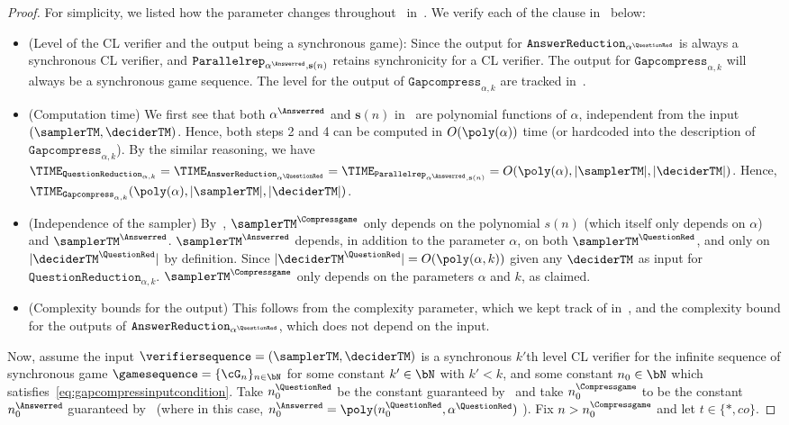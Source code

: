 \begin{proof}
	For simplicity, we listed how the parameter changes throughout~ in~. We verify each of the clause in~ below:
	\begin{itemize}
		\item (Level of the CL verifier and the output being a synchronous game): Since the output for $\texttt{AnswerReduction}_{\alpha^{\QuestionRed}}$ is always a synchronous CL verifier, and $\texttt{Parallelrep}_{\alpha^{\Answerred},\mathbf{s}(n)}$ retains synchronicity for a CL verifier. The output for $\texttt{Gapcompress}_{\alpha, k}$ will always be a synchronous game sequence. The level for the output of $\texttt{Gapcompress}_{\alpha, k}$ are tracked in~.
		\item (Computation time) We first see that both $\alpha^{\Answerred}$ and $\mathbf{s}(n)$ in~ are polynomial functions of $\alpha$, independent from the input $(\samplerTM, \deciderTM)$. Hence, both steps 2 and 4 can be computed in $O(\poly(\alpha))$ time (or hardcoded into the description of $\texttt{Gapcompress}_{\alpha, k}$). By the similar reasoning, we have $\TIME_{\texttt{QuestionReduction}_{\alpha, k}} = \TIME_{\texttt{AnswerReduction}_{\alpha^{\QuestionRed}}} = \TIME_{\texttt{Parallelrep}_{\alpha^{\Answerred}, \mathbf{s}(n)}} = O(\poly(\alpha), |\samplerTM|, |\deciderTM|)$. Hence, $\TIME_{\texttt{Gapcompress}_{\alpha, k}} (\poly(\alpha), |\samplerTM|, |\deciderTM|)$. 
		\item (Independence of the sampler) By~, $\samplerTM^{\Compressgame}$ only depends on the polynomial $s(n)$ (which itself only depends on $\alpha$) and $\samplerTM^{\Answerred}$. $\samplerTM^{\Answerred}$ depends, in addition to the parameter $\alpha$, on both $\samplerTM^{\QuestionRed}$, and only on $|\deciderTM^{\QuestionRed}|$ by definition. Since $|\deciderTM^{\QuestionRed}| =O(\poly(\alpha, k))$ given any $\deciderTM$ as input for $\texttt{QuestionReduction}_{\alpha, k}$. $\samplerTM^{\Compressgame}$ only depends on the parameters $\alpha$ and $k$, as claimed. 
		\item (Complexity bounds for the output) This follows from the complexity parameter, which we kept track of in~, and the complexity bound for the outputs of $\texttt{AnswerReduction}_{\alpha^{\QuestionRed}}$, which does not depend on the input.
	\end{itemize}
	
	Now, assume the input $\verifiersequence = (\samplerTM, \deciderTM)$ is a synchronous $k'$th level CL verifier for the infinite sequence of synchronous game $\gamesequence = \{\cG_n\}_{n \in \bN}$ for some constant $k' \in \bN$ with $k' < k$, and some constant $n_0 \in \bN$ which satisfies~\eqref{eq:gapcompressinputcondition}. Take $n_0^{\QuestionRed}$ be the constant guaranteed by~ and take $n_0^{\Compressgame}$ to be the constant $n_0^{\Answerred}$ guaranteed by~ (where in this case, $n_0^{\Answerred} = \poly(n_0^{\QuestionRed}, \alpha^{\QuestionRed})$ ). Fix $n > n_0^{\Compressgame}$ and let $t \in \{*, co\}$.
	

\end{proof}
